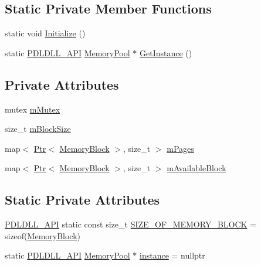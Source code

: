 \subsection*{Static Private Member Functions}
\begin{DoxyCompactItemize}
\item 
static void \mbox{\hyperlink{classpdl_1_1memory_1_1_memory_pool_a24344b3d700279d4950d91e3829cea39}{Initialize}} ()
\item 
static \mbox{\hyperlink{_p_d_core_8h_ae8c5186e53170509c65eaabab6c2c705}{P\+D\+L\+D\+L\+L\+\_\+\+A\+PI}} \mbox{\hyperlink{classpdl_1_1memory_1_1_memory_pool}{Memory\+Pool}} $\ast$ \mbox{\hyperlink{classpdl_1_1memory_1_1_memory_pool_a9d8ddbe3f2acad679013cd536a4afeb0}{Get\+Instance}} ()
\end{DoxyCompactItemize}
\subsection*{Private Attributes}
\begin{DoxyCompactItemize}
\item 
mutex \mbox{\hyperlink{classpdl_1_1memory_1_1_memory_pool_a452ebf3ca4b4d04adfc6b7df46bb7d11}{m\+Mutex}}
\item 
size\+\_\+t \mbox{\hyperlink{classpdl_1_1memory_1_1_memory_pool_ac049eebbbe4b0049e8072c668419cc56}{m\+Block\+Size}}
\item 
map$<$ \mbox{\hyperlink{classpdl_1_1memory_1_1_ptr}{Ptr}}$<$ \mbox{\hyperlink{classpdl_1_1memory_1_1_memory_pool_ae6b2ec19cb71cae4fa60b7d342a1743b}{Memory\+Block}} $>$, size\+\_\+t $>$ \mbox{\hyperlink{classpdl_1_1memory_1_1_memory_pool_acd9ee17a9a4c3b8d6a1108a202b33123}{m\+Pages}}
\item 
map$<$ \mbox{\hyperlink{classpdl_1_1memory_1_1_ptr}{Ptr}}$<$ \mbox{\hyperlink{classpdl_1_1memory_1_1_memory_pool_ae6b2ec19cb71cae4fa60b7d342a1743b}{Memory\+Block}} $>$, size\+\_\+t $>$ \mbox{\hyperlink{classpdl_1_1memory_1_1_memory_pool_a4adf868b844df86d3ced5bf08cde7b4e}{m\+Available\+Block}}
\end{DoxyCompactItemize}
\subsection*{Static Private Attributes}
\begin{DoxyCompactItemize}
\item 
\mbox{\hyperlink{_p_d_core_8h_ae8c5186e53170509c65eaabab6c2c705}{P\+D\+L\+D\+L\+L\+\_\+\+A\+PI}} static const size\+\_\+t \mbox{\hyperlink{classpdl_1_1memory_1_1_memory_pool_ae55489655a25238b3f6e509050dac2dc}{S\+I\+Z\+E\+\_\+\+O\+F\+\_\+\+M\+E\+M\+O\+R\+Y\+\_\+\+B\+L\+O\+CK}} = sizeof(\mbox{\hyperlink{classpdl_1_1memory_1_1_memory_pool_ae6b2ec19cb71cae4fa60b7d342a1743b}{Memory\+Block}})
\item 
static \mbox{\hyperlink{_p_d_core_8h_ae8c5186e53170509c65eaabab6c2c705}{P\+D\+L\+D\+L\+L\+\_\+\+A\+PI}} \mbox{\hyperlink{classpdl_1_1memory_1_1_memory_pool}{Memory\+Pool}} $\ast$ \mbox{\hyperlink{classpdl_1_1memory_1_1_memory_pool_a742e33f7e36a8197523fc4ca19d50e23}{instance}} = nullptr
\end{DoxyCompactItemize}



